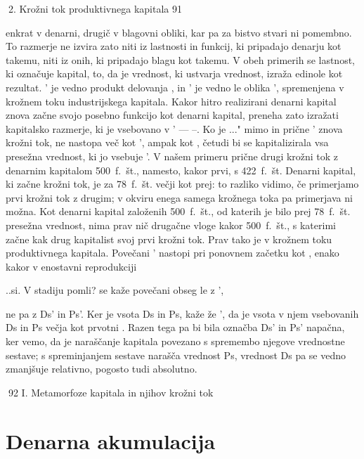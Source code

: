 \documentclass[kapital_02.tex]{subfiles}
\begin{document}
2. Krožni tok produktivnega kapitala 91



 enkrat v denarni, drugič v blagovni obliki, kar pa za bistvo stvari ni pomembno. To razmerje ne izvira zato niti iz lastnosti in funkcij, ki pripadajo denarju kot takemu, niti iz onih, ki pripadajo blagu kot takemu. V obeh primerih se lastnost, ki označuje kapital, to, da je vrednost, ki ustvarja vrednost, izraža edinole kot rezultat. \KPEB' je vedno produkt delovanja \KPEP, in \KPED' je vedno le oblika \KPEB', spremenjena v krožnem toku industrijskega kapitala. Kakor hitro realizirani denarni kapital znova začne svojo posebno funkcijo kot denarni kapital, preneha zato izražati kapitalsko razmerje, ki je vsebovano v \KPED' — \KPED --\KPEd. Ko je \KPED...\KPED" mimo in prične \KPED' znova krožni tok, ne nastopa več kot \KPED', ampak kot \KPED, četudi bi se kapitalizirala vsa presežna vrednost, ki jo vsebuje \KPED'. V našem primeru prične drugi krožni tok z denarnim kapitalom 500~f.~št., namesto, kakor prvi, s 422~f.~št. Denarni kapital, ki začne krožni tok, je za 78~f.~št. večji kot prej: to razliko vidimo, če primerjamo prvi krožni tok z drugim; v okviru enega samega krožnega toka pa primerjava ni možna. Kot denarni kapital založenih 500~f.~št., od katerih je bilo prej 78~f.~št. presežna vrednost, nima prav nič drugačne vloge kakor 500~f.~št., s katerimi začne kak drug kapitalist svoj prvi krožni tok. Prav tako je v krožnem toku produktivnega kapitala. Povečani \KPEP' nastopi pri ponovnem začetku kot \KPEP, enako kakor \KPEP v enostavni reprodukciji

\KPEP..si. V stadiju pomli? se kaže povečani obseg le z \KPEB',

ne pa z Ds' in Ps'. Ker je \KPEB vsota Ds in Ps, kaže že \KPEB', da je vsota v njem vsebovanih Ds in Ps večja kot prvotni \KPEP. Razen tega pa bi bila označba Ds' in Ps' napačna, ker vemo, da je naraščanje kapitala povezano s spremembo njegove vrednostne sestave; s spreminjanjem sestave narašča vrednost Ps, vrednost Ds pa se vedno zmanjšuje relativno, pogosto tudi absolutno.



92 I. Metamorfoze kapitala in njihov krožni tok



\section{Denarna akumulacija}
\end{document}
